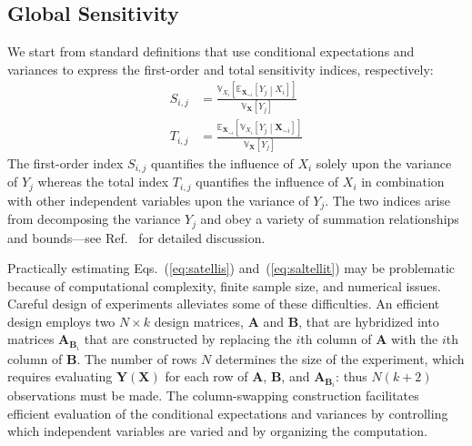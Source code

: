 \documentclass[12pt]{article}
\begin{document}
\subsection{Global Sensitivity}
\label{sec:glob}

We start from standard definitions \cite{saltelli_variance_2010} that use conditional expectations and variances to express the first-order and total sensitivity indices, respectively:
\begin{align}
    S_{i,j} & = \frac{\mathbb{V}_{X_i} \left[ \mathbb{E}_{\mathbf{X}_{\sim i}} \left[ Y_j \middle| X_i \right] \right]}{\mathbb{V}_\mathbf{X} \left[ Y_j \right]} \label{eq:satellis}
    \\
    T_{i,j} & = \frac{\mathbb{E}_{\mathbf{X}_{\sim i}} \left[ \mathbb{V}_{X_i} \left[ Y_j \middle| \mathbf{X}_{\sim i} \right] \right]}{\mathbb{V}_\mathbf{X} \left[ Y_j \right]} \label{eq:saltellit}
\end{align}
The first-order index $S_{i,j}$ quantifies the influence of $X_i$ solely upon the variance of $Y_j$ whereas the total index $T_{i,j}$ quantifies the influence of $X_i$ in combination with other independent variables upon the variance of $Y_j$. The two indices arise from decomposing the variance $Y_j$ and obey a variety of summation relationships and bounds---see Ref.~\cite{saltelli_sensitivity_2004} for detailed discussion.

Practically estimating Eqs.~(\ref{eq:satellis}) and~(\ref{eq:saltellit}) may be problematic because of computational complexity, finite sample size, and numerical issues. Careful design of experiments alleviates some of these difficulties. An efficient design employs two $N \times k$ design matrices, $\mathbf{A}$ and $\mathbf{B}$, that are hybridized into matrices $\mathbf{A}_{\mathbf{B}_i}$ that are constructed by replacing the $i$th column of $\mathbf{A}$ with the $i$th column of $\mathbf{B}$. The number of rows $N$ determines the size of the experiment, which requires evaluating $\mathbf{Y}\left(\mathbf{X}\right)$ for each row of $\mathbf{A}$, $\mathbf{B}$, and $\mathbf{A}_{\mathbf{B}_i}$: thus $N (k + 2)$ observations must be made. The column-swapping construction facilitates efficient evaluation of the conditional expectations and variances by controlling which independent variables are varied and by organizing the computation.
\end{document}
